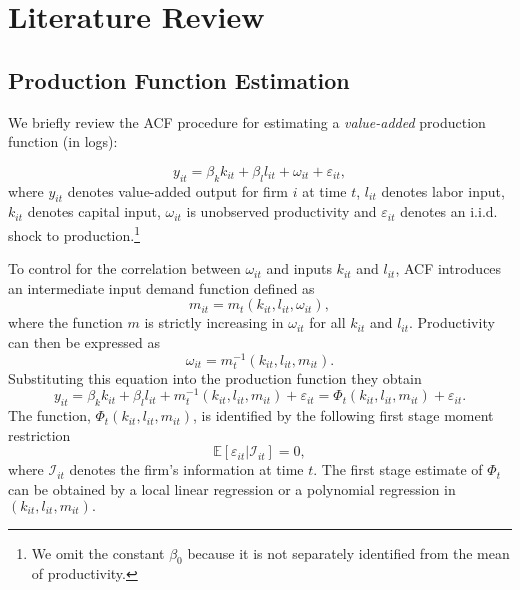 \documentclass[12pt]{article}
\begin{document}
\section{Literature Review} \label{litreview}
\subsection{Production Function Estimation}

We briefly review the ACF procedure for estimating a \textit{value-added} production function (in logs):

\begin{equation}
y_{it}=\beta_{k}k_{it}+\beta_{l}l_{it}+\omega_{it}+\varepsilon_{it},
\end{equation}
where $y_{it}$ denotes value-added output for firm $i$ at time $t$, $l_{it}$ denotes labor input, $k_{it}$ denotes capital input, $\omega_{it}$ is unobserved productivity and $\varepsilon_{it}$ denotes an i.i.d. shock to production.\footnote{We omit the constant $\beta_{0}$ because it is not separately identified from the mean of productivity.}

To control for the correlation between $\omega_{it}$ and inputs $k_{it}$ and $l_{it}$, ACF introduces an intermediate input demand function defined as
\begin{equation}
m_{it}=m_{t}(k_{it}, l_{it}, \omega_{it}),
\end{equation}
where the function $m$ is strictly increasing in $\omega_{it}$ for all $k_{it}$ and $l_{it}$. Productivity can then be expressed as
\begin{equation}
\omega_{it}=m_{t}^{-1}(k_{it}, l_{it}, m_{it}).
\end{equation}
Substituting this equation into the production function they obtain
\begin{equation}
y_{it}=\beta_{k}k_{it}+\beta_{l}l_{it}+m^{-1}_{t}(k_{it}, l_{it}, m_{it})+\varepsilon_{it}=\Phi_{t}(k_{it}, l_{it}, m_{it})+\varepsilon_{it}.
\end{equation}
The function, $\Phi_{t}(k_{it}, l_{it}, m_{it})$, is identified by the following first stage moment restriction
\begin{equation}
\mathbb{E}[\varepsilon_{it}|\mathcal{I}_{it}]=0,
\end{equation}
where $\mathcal{I}_{it}$ denotes the firm's information at time $t$. The first stage estimate of $\Phi_{t}$ can be obtained by a local linear regression or a polynomial regression in $(k_{it}, l_{it}, m_{it}).$
\end{document}
